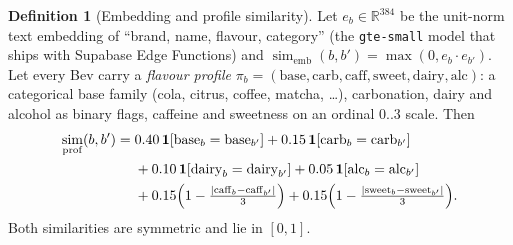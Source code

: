 \documentclass[11pt]{article}
\DeclarePairedDelimiter\abs{\lvert}{\rvert}
\DeclareMathOperator{\simi}{sim}
\newcommand{\code}[1]{\texttt{#1}}
\newcommand{\R}{\mathbb{R}}
\newcommand{\ind}[1]{\mathbf{1}\!\left[#1\right]}
\theoremstyle{plain}
\theoremstyle{definition}
\newtheorem{definition}[theorem]{Definition}
\theoremstyle{remark}
\begin{document}
\begin{definition}[Embedding and profile similarity]
Let $e_b \in \R^{384}$ be the unit-norm text embedding of ``brand, name, flavour, category'' (the \code{gte-small} model that ships with Supabase Edge Functions) and $\simi_{\mathrm{emb}}(b, b') = \max(0, e_b \cdot e_{b'})$. Let every Bev carry a \emph{flavour profile} $\pi_b = (\mathrm{base}, \mathrm{carb}, \mathrm{caff}, \mathrm{sweet}, \mathrm{dairy}, \mathrm{alc})$: a categorical base family (cola, citrus, coffee, matcha, \dots), carbonation, dairy and alcohol as binary flags, caffeine and sweetness on an ordinal $0..3$ scale. Then
\begin{equation}\label{eq:prof}
\begin{aligned}
\simi_{\mathrm{prof}}(b, b') ={}& 0.40\,\ind{\mathrm{base}_b = \mathrm{base}_{b'}} + 0.15\,\ind{\mathrm{carb}_b = \mathrm{carb}_{b'}} \\
&+ 0.10\,\ind{\mathrm{dairy}_b = \mathrm{dairy}_{b'}} + 0.05\,\ind{\mathrm{alc}_b = \mathrm{alc}_{b'}} \\
&+ 0.15\Bigl(1 - \tfrac{\abs{\mathrm{caff}_b - \mathrm{caff}_{b'}}}{3}\Bigr) + 0.15\Bigl(1 - \tfrac{\abs{\mathrm{sweet}_b - \mathrm{sweet}_{b'}}}{3}\Bigr).
\end{aligned}
\end{equation}
Both similarities are symmetric and lie in $[0, 1]$.
\end{definition}
\end{document}
